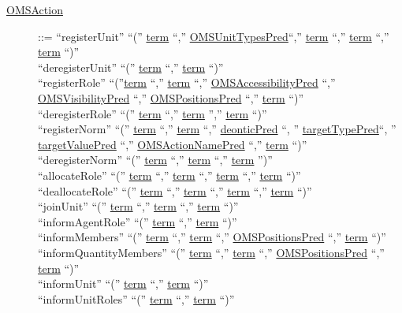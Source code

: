 \begin{description}
\item[\underline{OMSAction}] ::= ``registerUnit'' ``('' \underline{term} ``,'' \underline{OMSUnitTypesPred}``,'' \underline{term} ``,'' \underline{term} ``,'' \underline{term} ``)'' \textbar\\
 		``deregisterUnit'' ``('' \underline{term} ``,'' \underline{term} ``)'' \textbar \\
		``registerRole'' ``(''\underline{term} ``,'' \underline{term} ``,'' \underline{OMSAccessibilityPred} ``,'' \underline{OMSVisibilityPred} ``,'' \underline{OMSPositionsPred} ``,'' \underline{term} ``)'' \textbar \\
		``deregisterRole'' ``('' \underline{term} ``,'' \underline{term} '','' \underline{term} ``)'' \textbar\\
		``registerNorm'' ``('' \underline{term} ``,'' \underline{term} ``,'' \underline{deonticPred} ``, '' \underline{targetTypePred}``, '' \underline{targetValuePred} ``,'' \underline{OMSActionNamePred} ``,'' \underline{term} ``)'' \textbar\\
		``deregisterNorm'' ``('' \underline{term} ``,'' \underline{term} ``,'' \underline{term} '')'' \textbar \\
		``allocateRole'' ``('' \underline{term} ``,'' \underline{term} ``,'' \underline{term} ``,'' \underline{term} ``)'' \textbar \\
		``deallocateRole'' ``('' \underline{term} ``,'' \underline{term} ``,'' \underline{term} ``,'' \underline{term} ``)'' \textbar \\
		``joinUnit'' ``('' \underline{term} ``,'' \underline{term} ``,'' \underline{term} ``)'' \textbar \\
		``informAgentRole'' ``('' \underline{term} ``,'' \underline{term} ``)'' \textbar \\
		``informMembers'' ``('' \underline{term} ``,'' \underline{term} ``,'' \underline{OMSPositionsPred} ``,'' \underline{term} ``)'' \textbar\\
		``informQuantityMembers'' ``('' \underline{term} ``,'' \underline{term} ``,'' \underline{OMSPositionsPred} ``,'' \underline{term} ``)'' \textbar \\
		``informUnit'' ``('' \underline{term} ``,'' \underline{term} ``)'' \textbar \\
		``informUnitRoles'' ``('' \underline{term} ``,'' \underline{term} ``)'' \textbar \\ 

\end{description}
